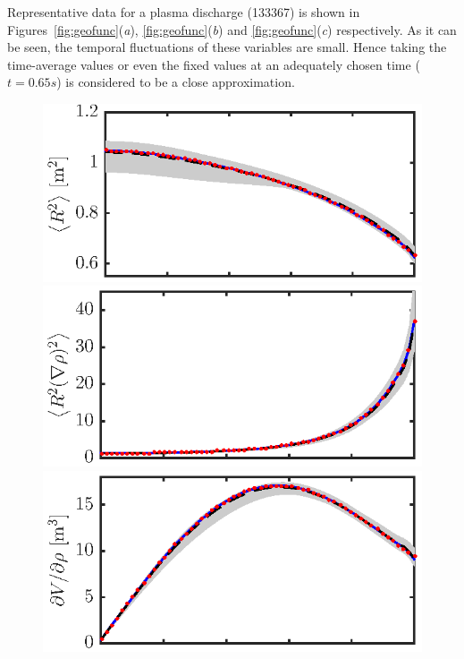 \documentclass[12pt]{iopart}
\begin{document}
Representative data for a plasma discharge (133367) is shown in Figures~\ref{fig:geofunc}(\emph{a}), \ref{fig:geofunc}(\emph{b}) and \ref{fig:geofunc}(\emph{c}) respectively.  As it can be seen, the temporal fluctuations of these variables are small. Hence taking the time-average values or even the fixed values at an adequately chosen time ($t = 0.65 s$) is considered to be a close approximation. 
\begin{figure} 
\includegraphics{imene_figs/fig1a} \hspace{-3em} \\
\includegraphics{imene_figs/fig1b} \hspace{-3em} \\
\includegraphics{imene_figs/fig1c} \hspace{-3em} \\[-.4em]

\end{figure}
\end{document}
